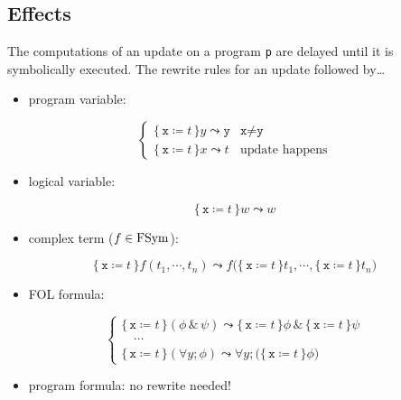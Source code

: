 		\subsection{Effects}
			The computations of an update on a program \texttt{p} are delayed until it is symbolically executed. The rewrite rules for an update followed by\dots
			\begin{itemize}
				\item program variable:
			\end{itemize}
			\begin{equation*}
				\begin{cases}
					\{\, \texttt{x} \coloneqq t \,\} y \leadsto \texttt{y} & \texttt{x} \neq \texttt{y} \\
					\{\, \texttt{x} \coloneqq t \,\} x \leadsto t          & \textrm{update happens}
				\end{cases}
			\end{equation*}
			\begin{itemize}
				\item logical variable:
			\end{itemize}
			\begin{equation*}
				\{\, \texttt{x} \coloneqq t \,\} w \leadsto w
			\end{equation*}
			\begin{itemize}
				\item complex term (\( f \in \operatorname{FSym} \)):
			\end{itemize}
			\begin{equation*}
				\{\, \texttt{x} \coloneqq t \,\} f(t_1, \cdots, t_n) \leadsto f\big( \{\, \texttt{x} \coloneqq t \,\} t_1, \cdots, \{\, \texttt{x} \coloneqq t \,\} t_n \big)
			\end{equation*}
			\begin{itemize}
				\item FOL formula:
			\end{itemize}
			\begin{equation*}
				\begin{cases}
					\{\, \texttt{x} \coloneqq t \,\} (\phi \,\&\, \psi) \leadsto \{\, \texttt{x} \coloneqq t \,\} \phi \,\&\, \{\, \texttt{x} \coloneqq t \,\} \psi \\
					\quad\cdots \\
					\{\, \texttt{x} \coloneqq t \,\} (\forall y; \phi) \leadsto \forall y; \big( \{\, \texttt{x} \coloneqq t \,\} \phi \big)
				\end{cases}
			\end{equation*}
			\begin{itemize}
				\item program formula: no rewrite needed!
			\end{itemize}

